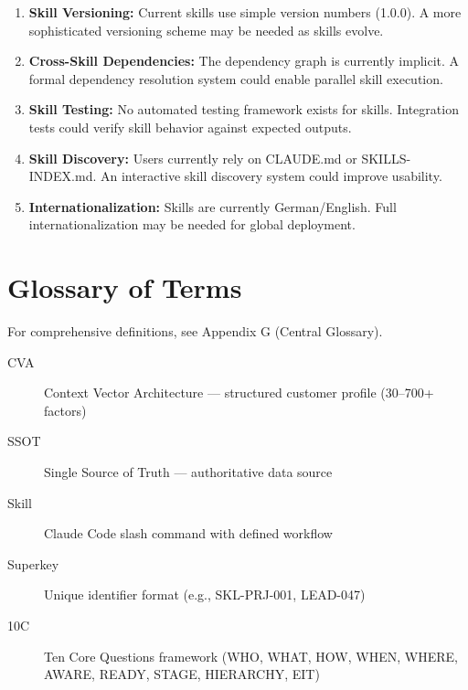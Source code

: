 \begin{enumerate}
\item \textbf{Skill Versioning:} Current skills use simple version numbers (1.0.0).
A more sophisticated versioning scheme may be needed as skills evolve.

\item \textbf{Cross-Skill Dependencies:} The dependency graph is currently implicit.
A formal dependency resolution system could enable parallel skill execution.

\item \textbf{Skill Testing:} No automated testing framework exists for skills.
Integration tests could verify skill behavior against expected outputs.

\item \textbf{Skill Discovery:} Users currently rely on CLAUDE.md or SKILLS-INDEX.md.
An interactive skill discovery system could improve usability.

\item \textbf{Internationalization:} Skills are currently German/English. Full
internationalization may be needed for global deployment.
\end{enumerate}


\section{Glossary of Terms}
\label{sec:sk-glossary}

For comprehensive definitions, see Appendix G (Central Glossary).

\begin{description}
\item[CVA] Context Vector Architecture --- structured customer profile (30--700+ factors)
\item[SSOT] Single Source of Truth --- authoritative data source
\item[Skill] Claude Code slash command with defined workflow
\item[Superkey] Unique identifier format (e.g., SKL-PRJ-001, LEAD-047)
\item[10C] Ten Core Questions framework (WHO, WHAT, HOW, WHEN, WHERE, AWARE, READY, STAGE, HIERARCHY, EIT)
\end{description}

